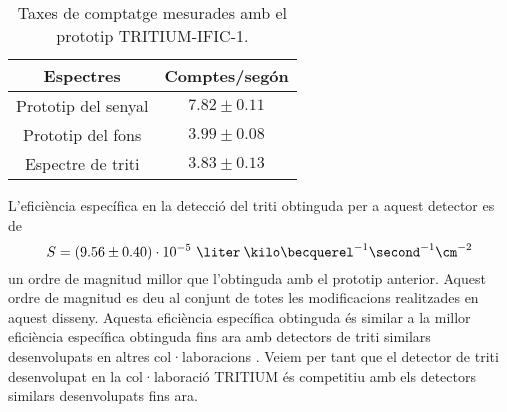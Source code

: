 \begin{table}[htbp]
\centering{}%
\begin{tabular}{cc}
\toprule 
Espectres & Comptes/segón  \tabularnewline
\midrule
\midrule 
Prototip del senyal & $7.82 \pm 0.11$ \tabularnewline
Prototip del fons & $3.99 \pm 0.08$ \tabularnewline  
Espectre de triti & $3.83 \pm 0.13$ \tabularnewline
\bottomrule
\end{tabular}
\caption{Taxes de comptatge mesurades amb el prototip TRITIUM-IFIC-1.}
\label{tab:ContesPerSegonTRITIUMIFIC1}
\end{table}

L'eficiència específica en la detecció del triti obtinguda per a aquest detector es de
$$S = (9.56 \pm 0.40)\cdot{} 10^{-5}~\liter\:\kilo\becquerel^{-1}\second^{-1}\cm^{-2}$$
un ordre de magnitud millor que l'obtinguda amb el prototip anterior. Aquest ordre de magnitud es deu al conjunt de totes les modificacions realitzades en aquest disseny. Aquesta eficiència específica obtinguda és similar a la millor eficiència específica obtinguda fins ara amb detectors de triti similars desenvolupats en altres col·laboracions \cite{Hofstetter1, Hofstetter2}. Veiem per tant que el detector de triti desenvolupat en la col·laboració TRITIUM és competitiu amb els detectors similars desenvolupats fins ara.